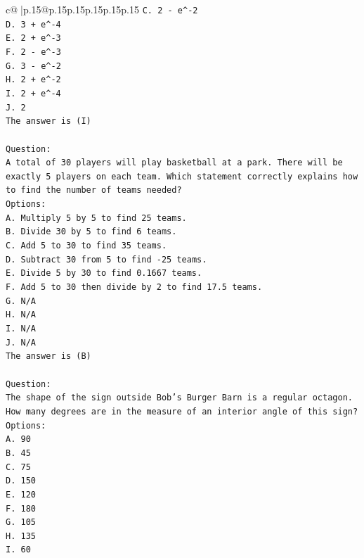 \documentclass{article}
\begin{document}
{\begin{supertabular}{c@{$\;$}|p{.15\linewidth}@{}p{.15\linewidth}p{.15\linewidth}p{.15\linewidth}p{.15\linewidth}p{.15\linewidth}}
{{{\texttt{C. 2 {-} e\^{}{-}2} \\
\texttt{D. 3 + e\^{}{-}4} \\
\texttt{E. 2 + e\^{}{-}3} \\
\texttt{F. 2 {-} e\^{}{-}3} \\
\texttt{G. 3 {-} e\^{}{-}2} \\
\texttt{H. 2 + e\^{}{-}2} \\
\texttt{I. 2 + e\^{}{-}4} \\
\texttt{J. 2} \\
\texttt{The answer is (I)} \\
\\ 
\texttt{Question:} \\
\texttt{A total of 30 players will play basketball at a park. There will be exactly 5 players on each team. Which statement correctly explains how to find the number of teams needed?} \\
\texttt{Options:} \\
\texttt{A. Multiply 5 by 5 to find 25 teams.} \\
\texttt{B. Divide 30 by 5 to find 6 teams.} \\
\texttt{C. Add 5 to 30 to find 35 teams.} \\
\texttt{D. Subtract 30 from 5 to find {-}25 teams.} \\
\texttt{E. Divide 5 by 30 to find 0.1667 teams.} \\
\texttt{F. Add 5 to 30 then divide by 2 to find 17.5 teams.} \\
\texttt{G. N/A} \\
\texttt{H. N/A} \\
\texttt{I. N/A} \\
\texttt{J. N/A} \\
\texttt{The answer is (B)} \\
\\ 
\texttt{Question:} \\
\texttt{The shape of the sign outside Bob's Burger Barn is a regular octagon. How many degrees are in the measure of an interior angle of this sign?} \\
\texttt{Options:} \\
\texttt{A. 90} \\
\texttt{B. 45} \\
\texttt{C. 75} \\
\texttt{D. 150} \\
\texttt{E. 120} \\
\texttt{F. 180} \\
\texttt{G. 105} \\
\texttt{H. 135} \\
\texttt{I. 60} \\
            }
        }
    }
     \\ \\


\end{supertabular}}
\end{document}
